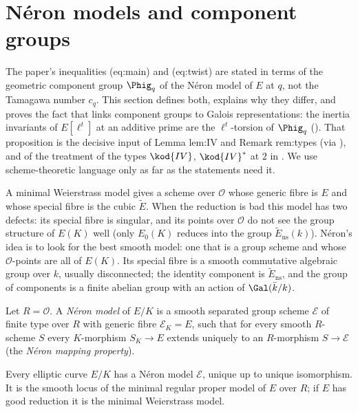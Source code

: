 \section{N\'eron models and component groups}\label{sec:reduction:neron}

The paper's inequalities (eq:main) and (eq:twist) are stated in terms of the geometric component group
$\Phig_q$ of the N\'eron model of $E$ at $q$, not the Tamagawa number $c_q$. This section defines both, explains
why they differ, and proves the fact that links component groups to Galois representations:
the inertia invariants of $E[\ell^t]$ at an additive prime are the $\ell^t$-torsion of $\Phig_q$
(). That proposition is the decisive input of Lemma lem:IV and Remark
rem:types (via ), and of the treatment of the types $\kod{IV}$, $\kod{IV}^*$ at $2$ in
. We use scheme-theoretic language only as far as the statements need it.

A minimal Weierstrass model gives a scheme over $\mathcal O$ whose generic fibre is $E$ and whose special fibre is
the cubic $\tilde E$. When the reduction is bad this model has two defects: its special fibre is singular, and
its points over $\mathcal O$ do not see the group structure of $E(K)$ well (only $E_0(K)$ reduces into the group
$\tilde E_{\mathrm{ns}}(k)$). N\'eron's idea is to look for the best smooth model: one that is a group scheme and
whose $\mathcal O$-points are all of $E(K)$. Its special fibre is a smooth commutative algebraic group over $k$,
usually disconnected; the identity component is $\tilde E_{\mathrm{ns}}$, and the group of components is a finite
abelian group with an action of $\Gal(\bar k/k)$.

\begin{definition}\label{def:reduction:neron}
Let $R=\mathcal O$. A \emph{N\'eron model} of $E/K$ is a smooth separated group scheme $\mathcal E$ of finite type over
$R$ with generic fibre $\mathcal E_K=E$, such that for every smooth $R$-scheme $S$ every $K$-morphism $S_K\to E$
extends uniquely to an $R$-morphism $S\to\mathcal E$ (the \emph{N\'eron mapping property}).
\end{definition}

\begin{theorem}[N\'eron]\label{thm:reduction:neron-existence}
Every elliptic curve $E/K$ has a N\'eron model $\mathcal E$, unique up to unique isomorphism. It is the smooth
locus of the minimal regular proper model of $E$ over $R$; if $E$ has good reduction it is the minimal
Weierstrass model.
\end{theorem}

